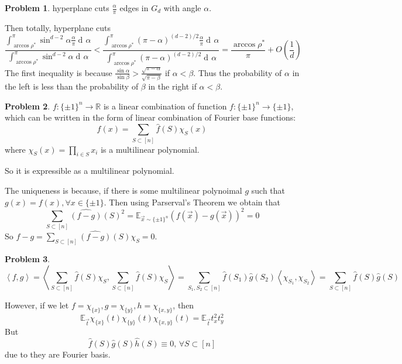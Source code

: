 \documentclass[a4paper]{article}
\theoremstyle{definition}
\newtheorem{problem}{Problem}
\theoremstyle{plain}
\newcommand{\Rbb}{\mathbb R}
\newcommand{\Ebb}{\mathbb E}
\newcommand{\dps}{\displaystyle}
\newcommand{\<}{\left<}
\renewcommand{\>}{\right>}
\numberwithin{equation}{problem}
\DeclareMathOperator{\dd}{d\!}
\begin{document}
\begin{problem}
  hyperplane cuts  $ \frac{\alpha}{\pi} $ edges in  $ G_d $ with angle  $ \alpha $.
  
  Then totally, hyperplane cuts 
  \[\frac{\int_{\arccos\rho^*}^\pi \sin^{d-2}\alpha\frac{\alpha}{\pi}\dd \alpha}{\int_{\arccos\rho^*}^\pi\sin^{d-2}\alpha\dd \alpha}<\frac{\int_{\arccos\rho^*}^\pi(\pi-\alpha)^{(d-2)/2}\frac{\alpha}{\pi}\dd\alpha}{\int_{\arccos\rho^*}^\pi(\pi-\alpha)^{(d-2)/2}\dd \alpha}=\frac{\arccos\rho^*}{\pi}+O(\frac{1}{d})\]
  The first inequality is because  $ \dps\frac{\sin \alpha}{\sin \beta}>\frac{\sqrt{\pi-\alpha}}{\sqrt{\pi-\beta}} $ if  $ \alpha<\beta $. Thus the probability of  $ \alpha $ in the left is less than the probability of  $ \beta $ in the right if  $ \alpha<\beta $.

\end{problem}
\begin{problem}
   $ f:\{\pm 1\}^n\rightarrow \Rbb $ is a linear combination of function  $ f:\{\pm 1\}^n\rightarrow \{\pm 1\} $, which can be written in the form of linear combination of Fourier base functions:
   \[f(x)=\sum_{S\subset [n]}\hat{f}(S)\chi_S(x)\]
   where  $ \dps\chi_S(x)=\prod_{i\in S}x_i $ is a multilinear polynomial.
   
   So it is expressible as a multilinear polynomial.

   The uniqueness is because, if there is some multilinear polynoimal  $ g $ such that  $ g(x)=f(x),\forall x\in\{\pm 1\} $. Then using Parserval's Theorem we obtain that 
   \[\sum_{S\subset [n]}\hat{(f-g)}(S)^2=\Ebb_{\vec{x}\sim\{\pm 1\}^n}(f(\vec{x})-g(\vec{x}))^2=0\]
   So  $ f-g=\dps\sum_{S\subset [n]}\hat{(f-g)}(S)\chi_S=0 $.   
\end{problem}
\begin{problem}
    \[\<f,g\>=\<\sum_{S\subset [n]}\hat{f}(S)\chi_S,\sum_{S\subset [n]}\hat{f}(S)\chi_S\>=\sum_{S_1,S_2\subset [n]}\hat{f}(S_1)\hat{g}(S_2)\<\chi_{S_1},\chi_{S_2}\>=\sum_{S\subset [n]}\hat{f}(S)\hat{g}(S)\]

    However, if we let  $ f=\chi_{\{x\}},g=\chi_{\{y\}},h=\chi_{\{x,y\}} $, then 
    \[\Ebb_{\vec{t}}\chi_{\{x\}}(t)\chi_{\{y\}}(t)\chi_{\{x,y\}}(t)=\Ebb_{\vec{t}}t_x^2t_y^2\]
    But 
    \[\hat{f}(S)\hat{g}(S)\hat{h}(S)\equiv 0,\,\forall S\subset [n]\]
    due to they are Fourier basis.
\end{problem}
\end{document}
